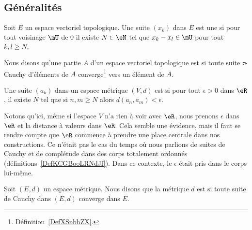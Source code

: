 \subsection{Généralités}

\begin{definition}   \label{DefZSnlbPc}
	Soit \( E\) un espace vectoriel topologique. Une suite \( (x_k)\) dans \( E\) est une  si pour tout voisinage \( \mU\) de \( 0\) il existe \( N\in \eN\) tel que \( x_k-x_l\in\mU\) pour tout \( k,l\geq N\).
\end{definition}

\begin{definition}      \label{DEFooVQDBooNxprFU}
	Nous disons qu'une partie \( A\) d'un espace vectoriel topologique est  si toute suite \(  \tau\)-Cauchy d'éléments de \( A\) converge\footnote{Définition~\ref{DefXSnbhZX}.} vers un élément de \( A\).
\end{definition}

\begin{definition}      \label{DEFooXOYSooSPTRTn}
	Une suite \( (a_k)\) dans un espace métrique \( (V,d)\) est  si pour tout \( \epsilon> 0\) dans \( \eR\), il existe \( N\) tel que si \( n,m\geq N\) alors \( d(a_n,a_m)<\epsilon\).
\end{definition}

Notons qu'ici, même si l'espace \( V\) n'a rien à voir avec \( \eR\), nous prenons \( \epsilon\) dans \( \eR\) et la distance à valeurs dans \( \eR\). Cela semble une évidence, mais il faut se rendre compte que \( \eR\) commence à prendre une place centrale dans nos constructions. Ce n'était pas le cas du temps où nous parlions de suites de Cauchy et de complétude dans des corps totalement ordonnés (définitions~\ref{DefKCGBooLRNdJf}). Dans ce contexte, le \( \epsilon\) était pris dans le corps lui-même.

\begin{definition}       \label{DEFooHBAVooKmqerL}
	Soit \( (E,d)\) un espace métrique. Nous disons que la métrique \( d\) est  si toute suite de Cauchy dans \( (E,d)\) converge dans \( E\).
\end{definition}

